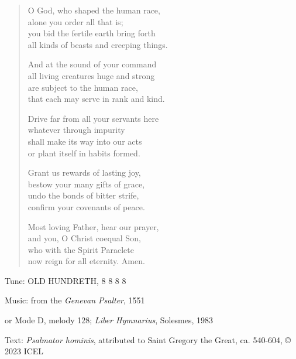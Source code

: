 \hymn

\begin{verse}
O God, who shaped the human race,\\
alone you order all that is;\\
you bid the fertile earth bring forth\\
all kinds of beasts and creeping things.

And at the sound of your command\\
all living creatures huge and strong\\
are subject to the human race,\\
that each may serve in rank and kind.

Drive far from all your servants here\\
whatever through impurity\\
shall make its way into our acts\\
or plant itself in habits formed.

Grant us rewards of lasting joy,\\
bestow your many gifts of grace,\\
undo the bonds of bitter strife,\\
confirm your covenants of peace.

Most loving Father, hear our prayer,\\
and you, O Christ coequal Son,\\
who with the Spirit Paraclete\\
now reign for all eternity. Amen.
\end{verse}

\begin{hymnsource}
Tune: OLD HUNDRETH, 8 8 8 8

Music: from the \emph{Genevan Psalter}, 1551

or Mode D, melody 128; \emph{Liber Hymnarius}, Solesmes, 1983

Text: \emph{Psalmator hominis}, attributed to Saint Gregory the Great, ca. 540-604, © 2023 ICEL
\end{hymnsource}